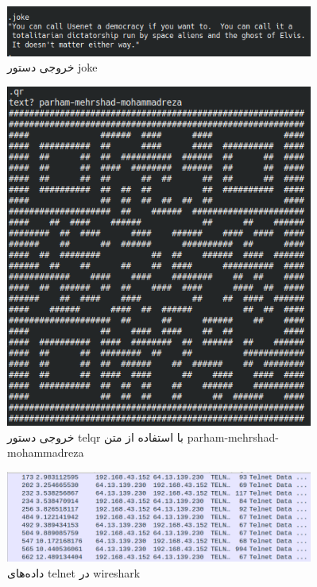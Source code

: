 \documentclass{article}
\begin{document}
\begin{figure}[h!]
	\centering
	\includegraphics[width=0.9\textwidth]{src/teljoke.png}
	\caption{
		خروجی دستور joke
	}
	\label{fig:teljoke}
\end{figure}
\begin{figure}[h!]
	\centering
	\includegraphics[width=0.9\textwidth]{src/telqr.png}
	\caption{
		خروجی دستور telqr با استفاده از متن parham-mehrshad-mohammadreza
	}
	\label{fig:telqr}
\end{figure}
\begin{figure}[h!]
	\centering
	\includegraphics[width=0.9\textwidth]{src/telwire.png}
	\caption{
		داده‌های telnet در wireshark
	}
	\label{fig:telnetwire}
\end{figure}
\end{document}

